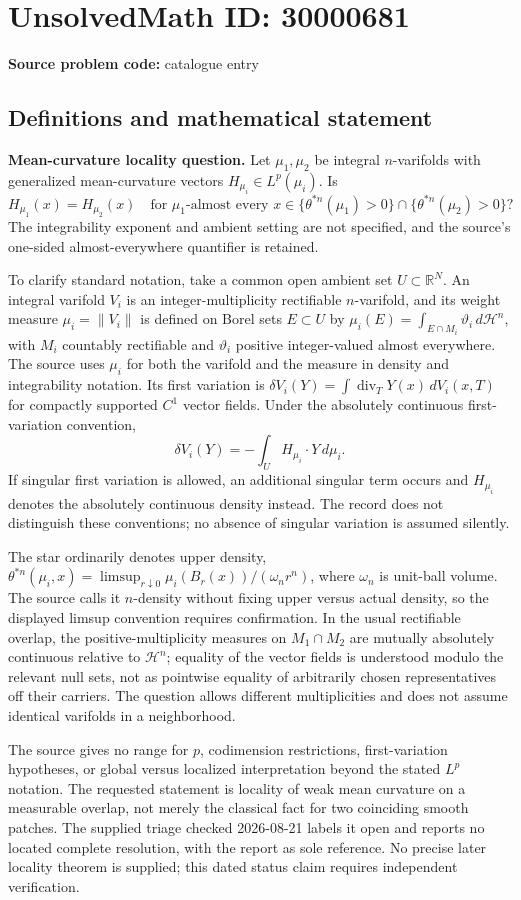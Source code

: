 \documentclass[11pt]{article}
\newcommand{\R}{\mathbb{R}}
\begin{document}
\section*{UnsolvedMath ID: 30000681}
\textbf{Source problem code:} catalogue entry
\subsection{Definitions and mathematical statement}
\textbf{Mean-curvature locality question.} Let \(\mu_1,\mu_2\) be integral \(n\)-varifolds with generalized mean-curvature vectors \(H_{\mu_i}\in L^p(\mu_i)\). Is\[H_{\mu_1}(x)=H_{\mu_2}(x)\quad\text{for }\mu_1\text{-almost every }x\in\{\theta^{*n}(\mu_1)>0\}\cap\{\theta^{*n}(\mu_2)>0\}?\] The integrability exponent and ambient setting are not specified, and the source's one-sided almost-everywhere quantifier is retained.\par To clarify standard notation, take a common open ambient set \(U\subset\R^N\). An integral varifold \(V_i\) is an integer-multiplicity rectifiable \(n\)-varifold, and its weight measure \(\mu_i=\|V_i\|\) is defined on Borel sets \(E\subset U\) by \(\mu_i(E)=\int_{E\cap M_i}\vartheta_i\,d\mathcal H^n\), with \(M_i\) countably rectifiable and \(\vartheta_i\) positive integer-valued almost everywhere. The source uses \(\mu_i\) for both the varifold and the measure in density and integrability notation. Its first variation is \(\delta V_i(Y)=\int\operatorname{div}_T Y(x)\,dV_i(x,T)\) for compactly supported \(C^1\) vector fields. Under the absolutely continuous first-variation convention,\[\delta V_i(Y)=-\int_UH_{\mu_i}\cdot Y\,d\mu_i.\] If singular first variation is allowed, an additional singular term occurs and \(H_{\mu_i}\) denotes the absolutely continuous density instead. The record does not distinguish these conventions; no absence of singular variation is assumed silently.\par The star ordinarily denotes upper density, \(\theta^{*n}(\mu_i,x)=\limsup_{r\downarrow0}\mu_i(B_r(x))/(\omega_nr^n)\), where \(\omega_n\) is unit-ball volume. The source calls it \(n\)-density without fixing upper versus actual density, so the displayed limsup convention requires confirmation. In the usual rectifiable overlap, the positive-multiplicity measures on \(M_1\cap M_2\) are mutually absolutely continuous relative to \(\mathcal H^n\); equality of the vector fields is understood modulo the relevant null sets, not as pointwise equality of arbitrarily chosen representatives off their carriers. The question allows different multiplicities and does not assume identical varifolds in a neighborhood.\par The source gives no range for \(p\), codimension restrictions, first-variation hypotheses, or global versus localized interpretation beyond the stated \(L^p\) notation. The requested statement is locality of weak mean curvature on a measurable overlap, not merely the classical fact for two coinciding smooth patches. The supplied triage checked 2026-08-21 labels it open and reports no located complete resolution, with the report as sole reference. No precise later locality theorem is supplied; this dated status claim requires independent verification.
\end{document}
